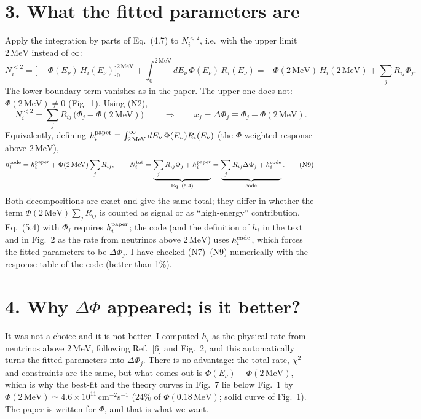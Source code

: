 \documentclass[11pt,a4paper]{article}
\newcommand{\Ev}{E_\nu}
\newcommand{\Rb}[1]{R_{#1}}
\newcommand{\Hb}[1]{H_{#1}}
\newcommand{\Phit}{\Phi(2\,\mathrm{MeV})}
\newcommand{\Etwo}{2\,\mathrm{MeV}}
\begin{document}
\section*{3. What the fitted parameters are}
Apply the integration by parts of Eq.~(4.7) to $N_i^{<2}$, i.e.\ with the upper limit $\Etwo$ instead of $\infty$:
\begin{equation}
N_i^{<2}=\Big[-\Phi(\Ev)\,\Hb{i}(\Ev)\Big]_0^{\Etwo}+\int_0^{\Etwo}d\Ev\,\Phi(\Ev)\,\Rb{i}(\Ev)
=-\Phit\,\Hb{i}(\Etwo)+\sum_j R_{ij}\Phi_j .
\tag{N7}
\end{equation}
The lower boundary term vanishes as in the paper. The upper one does not: $\Phit\neq0$ (Fig.~1). Using (N2),
\begin{equation}
\boxed{\;N_i^{<2}=\sum_j R_{ij}\,\big(\Phi_j-\Phit\big)\;}
\qquad\Longrightarrow\qquad
x_j=\Delta\Phi_j\equiv\Phi_j-\Phit .
\tag{N8}
\end{equation}
Equivalently, defining $h_i^{\rm paper}\equiv\int_{\Etwo}^\infty d\Ev\,\Phi(\Ev)\Rb{i}(\Ev)$ (the $\Phi$-weighted response above $\Etwo$),
\begin{equation}
h_i^{\rm code}=h_i^{\rm paper}+\Phit\sum_j R_{ij},
\qquad
N_i^{\rm tot}=\underbrace{\sum_j R_{ij}\Phi_j+h_i^{\rm paper}}_{\text{Eq.~(5.4)}}
=\underbrace{\sum_j R_{ij}\Delta\Phi_j+h_i^{\rm code}}_{\text{code}} .
\tag{N9}
\end{equation}
Both decompositions are exact and give the same total; they differ in whether the term $\Phit\sum_j R_{ij}$ is
counted as signal or as ``high-energy'' contribution. Eq.~(5.4) with $\Phi_j$ requires $h_i^{\rm paper}$; the code
(and the definition of $h_i$ in the text and in Fig.~2 as the rate from neutrinos above $\Etwo$) uses $h_i^{\rm code}$,
which forces the fitted parameters to be $\Delta\Phi_j$. I have checked (N7)--(N9) numerically with the response table
of the code (better than 1\%).

\section*{4. Why $\Delta\Phi$ appeared; is it better?}
It was not a choice and it is not better. I computed $h_i$ as the physical rate from neutrinos above $\Etwo$, following
Ref.~[6] and Fig.~2, and this automatically turns the fitted parameters into $\Delta\Phi_j$. There is no advantage: the
total rate, $\chi^2$ and constraints are the same, but what comes out is $\Phi(\Ev)-\Phit$, which is why the
best-fit and the theory curves in Fig.~7 lie below Fig.~1 by $\Phit\simeq4.6\times10^{11}\,$cm$^{-2}$s$^{-1}$
($24\%$ of $\Phi(0.18\,\mathrm{MeV})$; solid curve of Fig.~1). The paper is written for $\Phi$, and that is what we want.
\end{document}
